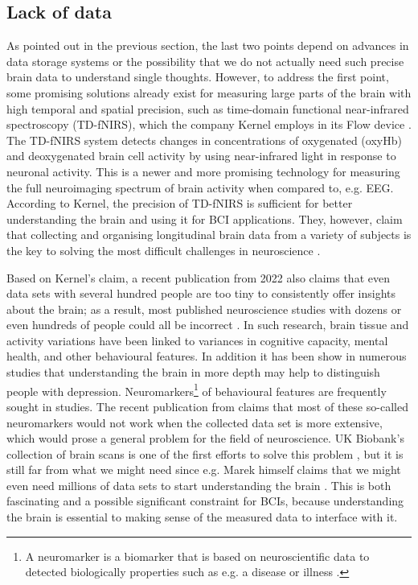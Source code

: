 \subsection{Lack of data}
\label{chapter2-lack-of-data}

As pointed out in the previous section, the last two points depend on advances in data storage systems or the possibility that we do not actually need such precise brain data to understand single thoughts. However, to address the first point, some promising solutions already exist for measuring large parts of the brain with high temporal and spatial precision, such as time-domain functional near-infrared spectroscopy (TD-fNIRS), which the company Kernel employs in its Flow device \citep{ban_kernel_2021}. The TD-fNIRS system detects changes in concentrations of oxygenated (oxyHb) and deoxygenated brain cell activity by using near-infrared light in response to neuronal activity. This is a newer and more promising technology for measuring the full neuroimaging spectrum of brain activity when compared to, e.g. EEG. According to Kernel, the precision of TD-fNIRS is sufficient for better understanding the brain and using it for BCI applications. They, however, claim that collecting and organising longitudinal brain data from a variety of subjects is the key to solving the most difficult challenges in neuroscience \citep{kernel_hello-humanitypdf_nodate}.

\newpage

Based on Kernel's claim, a recent publication from 2022 also claims that even data sets with several hundred people are too tiny to consistently offer insights about the brain; as a result, most published neuroscience studies with dozens or even hundreds of people could all be incorrect \citep{marek_reproducible_2022}. In such research, brain tissue and activity variations have been linked to variances in cognitive capacity, mental health, and other behavioural features. In addition it has been show in numerous studies that understanding the brain in more depth may help to distinguish people with depression. Neuromarkers\footnote{A neuromarker is a biomarker that is based on neuroscientific data to detected biologically properties such as e.g. a disease or illness \citep{jollans_neuromarkers_2018}.} of behavioural features are frequently sought in studies. The recent publication from \citeauthor{marek_reproducible_2022} claims that most of these so-called neuromarkers would not work when the collected data set is more extensive, which would prose a general problem for the field of neuroscience. UK Biobank's collection of brain scans is one of the first efforts to solve this problem \citep{noauthor_imaging_nodate}, but it is still far from what we might need since e.g. Marek himself claims that we might even need millions of data sets to start understanding the brain \citep{callaway_can_2022}. This is both fascinating and a possible significant constraint for BCIs, because understanding the brain is essential to making sense of the measured data to interface with it.

